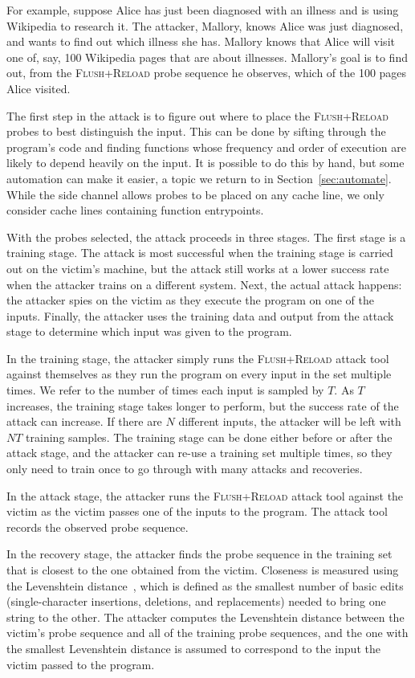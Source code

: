 \documentclass[letterpaper,twocolumn,10pt]{article}
\begin{document}
For example, suppose Alice has just been diagnosed with an illness and is using
Wikipedia to research it. The attacker, Mallory, knows Alice was just diagnosed,
and wants to find out which illness she has. Mallory knows that Alice will visit
one of, say, 100 Wikipedia pages that are about illnesses. Mallory's goal is to
find out, from the \textsc{Flush+Reload} probe sequence he observes, which of
the 100 pages Alice visited.

The first step in the attack is to figure out where to place the
\textsc{Flush+Reload} probes to best distinguish the input. This can be done by
sifting through the program's code and finding functions whose frequency and
order of execution are likely to depend heavily on the input. It is possible to
do this by hand, but some automation can make it easier, a topic we return to in
Section~\ref{sec:automate}. While the side channel allows probes to be placed on
any cache line, we only consider cache lines containing function entrypoints.

With the probes selected, the attack proceeds in three stages. The first stage
is a training stage. The attack is most successful when the training stage is
carried out on the victim's machine, but the attack still works at a lower
success rate when the attacker trains on a different system. Next, the actual
attack happens: the attacker spies on the victim as they execute the program on
one of the inputs. Finally, the attacker uses the training data and output from
the attack stage to determine which input was given to the program.

In the training stage, the attacker simply runs the \textsc{Flush+Reload} attack
tool against themselves as they run the program on every input in the set
multiple times. We refer to the number of times each input is sampled by $T$. As
$T$ increases, the training stage takes longer to perform, but the success rate
of the attack can increase. If there are $N$ different inputs, the attacker will
be left with $NT$ training samples. The training stage can be done either before
or after the attack stage, and the attacker can re-use a training set multiple
times, so they only need to train once to go through with many attacks and
recoveries.

In the attack stage, the attacker runs the \textsc{Flush+Reload} attack tool
against the victim as the victim passes one of the inputs to the program. The
attack tool records the observed probe sequence.

In the recovery stage, the attacker finds the probe sequence in the training set
that is closest to the one obtained from the victim. Closeness is measured using
the Levenshtein distance~\cite{levenshtein1966binary}, which is defined as the
smallest number of basic edits (single-character insertions, deletions, and
replacements) needed to bring one string to the other. The attacker computes the
Levenshtein distance between the victim's probe sequence and all of the training
probe sequences, and the one with the smallest Levenshtein distance is assumed
to correspond to the input the victim passed to the program.
\end{document}
